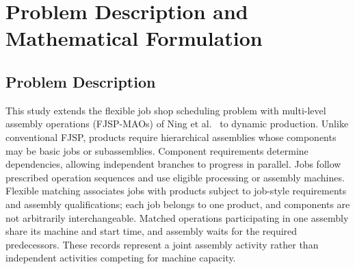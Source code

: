 
\section{Problem Description and Mathematical Formulation}

\label{sec:problem}

\subsection{Problem Description}
\label{subsec:problem_description}

This study extends the flexible job shop scheduling problem with multi-level assembly operations
(FJSP-MAOs) of Ning et al.~\cite{ning2027fjspmaos} to dynamic production. Unlike conventional FJSP,
products require hierarchical assemblies whose components may be basic jobs or subassemblies.
Component requirements determine dependencies, allowing independent branches to progress in parallel.
Jobs follow prescribed operation sequences and use eligible processing or assembly machines.
Flexible matching associates jobs with products subject to job-style requirements and assembly
qualifications; each job belongs to one product, and components are not arbitrarily interchangeable.
Matched operations participating in one assembly share its machine and start time, and assembly
waits for the required predecessors. These records represent a joint assembly activity rather than
independent activities competing for machine capacity.


